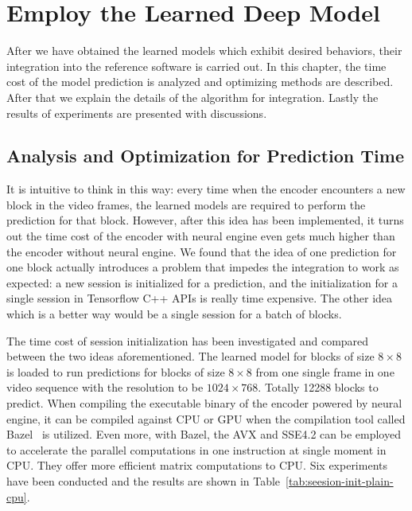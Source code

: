 \chapter{Employ the Learned Deep Model}\label{ch:chapter5} %
%
%
After we have obtained the learned models 
which exhibit desired behaviors, 
their integration into the reference software is carried out.
In this chapter, the time cost of the model prediction
is analyzed and optimizing methods are described.
After that we explain the details of the algorithm for integration.
Lastly the results of experiments 
are presented with discussions.

\section{Analysis and Optimization for Prediction Time}\label{sec:analysis-and-optimization}
It is intuitive to think in this way: 
every time when the encoder encounters a new block in the video frames,
the learned models are required to perform the prediction for that block.
However, after this idea has been implemented, it turns out the
time cost of the encoder with neural engine even gets much higher 
than the encoder without neural engine.
We found that the idea of one prediction for one block actually
introduces a problem that impedes the integration to work as expected:
a new session is initialized for a prediction, and the initialization
for a single session in Tensorflow C++ APIs is really time
expensive.
The other idea which is a better way would be a single 
session for a batch of blocks.

The time cost of session initialization has been investigated
and compared between the two ideas aforementioned.
The learned model for blocks of size \(8\times8\) is loaded 
to run predictions for blocks of size \(8\times8\) from one single
frame in one video sequence with the resolution to 
be \(1024\times768\).
Totally 12288 blocks to predict.
When compiling the executable binary of the encoder
powered by neural engine, it can be compiled 
against CPU or GPU when the compilation tool 
called Bazel~\parencite{RN200} is utilized.
Even more, with Bazel, the AVX and SSE4.2 can be employed to
accelerate the parallel computations in one instruction
at single moment in CPU\@.
They offer more efficient matrix computations
to CPU\@.
Six experiments have been conducted and the results
are shown in 
Table~\ref{tab:seesion-init-plain-cpu}.

